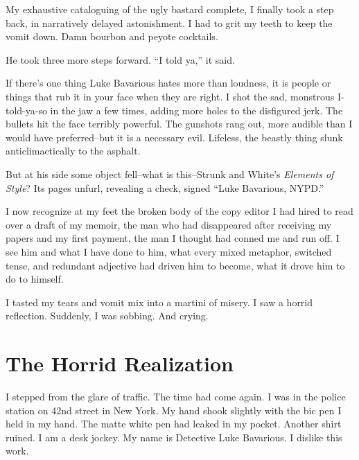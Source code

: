 My exhaustive cataloguing of the ugly bastard complete, I finally
took a step back, in narratively delayed astonishment. I had to
grit my teeth to keep the vomit down. Damn bourbon and peyote
cocktails.



He took three more steps forward. ``I told ya,'' it
said.



If there's one thing Luke Bavarious hates more than loudness,
it is people or things that rub it in your face when they are
right. I shot the sad, monstrous I-told-ya-so in the jaw a few
times, adding more holes to the disfigured jerk. The bullets hit
the face terribly powerful. The gunshots rang out, more audible
than I would have preferred--but it is a necessary evil. Lifeless,
the beastly thing slunk anticlimactically to the asphalt.



But at his side some object fell--what is this--Strunk and
White's {\em Elements of Style}? Its pages unfurl, revealing
a check, signed ``Luke Bavarious, NYPD.''



I now recognize at my feet the broken body of the copy editor I had
hired to read over a draft of my memoir, the man who had
disappeared after receiving my papers and my first payment, the man
I thought had conned me and run off. I see him and what I have done
to him, what every mixed metaphor, switched tense, and redundant
adjective had driven him to become, what it drove him to do to
himself.



I tasted my tears and vomit mix into a martini of misery. I saw a
horrid reflection. Suddenly, I was sobbing. And crying. 

 




\chapter{The Horrid Realization}



I stepped from the glare of traffic. The time had come again. I was
in the police station on 42nd street in New York. My hand shook
slightly with the bic pen I held in my hand. The matte white pen
had leaked in my pocket. Another shirt ruined. I am a desk jockey.
My name is Detective Luke Bavarious. I dislike this work.


